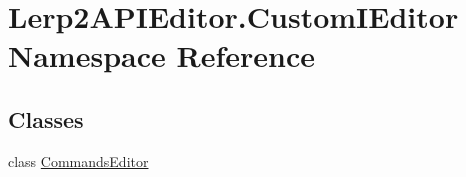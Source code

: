 \hypertarget{namespace_lerp2_a_p_i_editor_1_1_custom_i_editor}{}\section{Lerp2\+A\+P\+I\+Editor.\+Custom\+I\+Editor Namespace Reference}
\label{namespace_lerp2_a_p_i_editor_1_1_custom_i_editor}
\subsection*{Classes}
\begin{DoxyCompactItemize}
\item 
class \hyperlink{class_lerp2_a_p_i_editor_1_1_custom_i_editor_1_1_commands_editor}{Commands\+Editor}
\end{DoxyCompactItemize}
